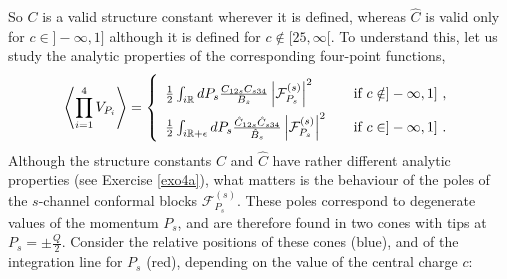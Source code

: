 \documentclass[12pt, a4paper, notitlepage, twoside]{report}
\numberwithin{equation}{section}
\theoremstyle{break}
\begin{document}
So $C$ is a valid structure constant wherever it is defined, whereas $\hat C$ is valid only for $c\in ]-\infty, 1]$ although it is defined for $c\notin [25,\infty[$.
To understand this, let us study the analytic properties of the corresponding four-point functions,
\begin{align}
\renewcommand{\arraystretch}{2}
 \left< \prod_{i=1}^4 V_{P_i}\right> = 
 \left\{\begin{array}{ll} 
         \frac12 \int_{i\mathbb{R}} dP_s \frac{C_{12s}C_{s34}}{B_s} \left|\mathcal{F}_{P_s}^{(s)} \right|^2 \quad & \text{if } c\notin ]-\infty, 1]\ ,
         \\
         \frac12 \int_{i\mathbb{R}+\epsilon} dP_s \frac{\hat C_{12s}\hat C_{s34}}{\hat B_s} \left|\mathcal{F}_{P_s}^{(s)} \right|^2 \quad & \text{if } c\in ]-\infty, 1]\ .
        \end{array}
 \right.
 \label{vfcch}
\end{align}
Although the structure constants $C$ and $\hat C$ have rather different analytic properties (see Exercise \ref{exo4a}), what matters is the behaviour of the poles of the $s$-channel conformal blocks $\mathcal{F}_{P_s}^{(s)}$. 
These poles correspond to degenerate values of the momentum $P_s$, and are therefore found in two cones with tips at $P_s= \pm\frac{Q}{2}$. 
Consider the relative positions of these cones (blue), and of the integration line for $P_s$ (red), depending on the value of the central charge $c$:
\end{document}
